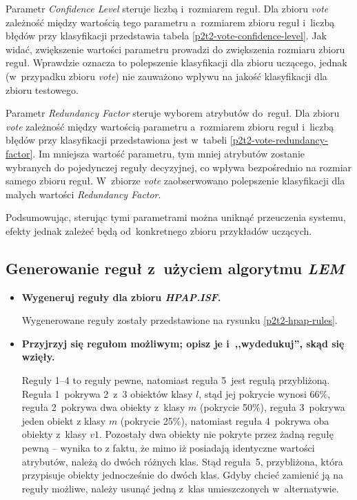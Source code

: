 \begin{itemize}
	
Parametr \emph{Confidence Level} steruje liczbą i~rozmiarem reguł. Dla zbioru \emph{vote} zależność między wartością tego parametru a~rozmiarem zbioru reguł i~liczbą błędów przy klasyfikacji przedstawia tabela \ref{p2t2-vote-confidence-level}. Jak widać, zwiększenie wartości parametru prowadzi do zwiększenia rozmiaru zbioru reguł. Wprawdzie oznacza to polepszenie klasyfikacji dla zbioru uczącego, jednak (w~przypadku zbioru \emph{vote}) nie zauważono wpływu na jakość klasyfikacji dla zbioru testowego.

	
Parametr \emph{Redundancy Factor} steruje wyborem atrybutów do~reguł. Dla zbioru \emph{vote} zależność między wartością parametru a~rozmiarem zbioru reguł i~liczbą błędów przy klasyfikacji przedstawiona jest w~tabeli \ref{p2t2-vote-redundancy-factor}. Im mniejsza wartość parametru, tym mniej atrybutów zostanie wybranych do pojedynczej reguły decyzyjnej, co wpływa bezpośrednio na rozmiar samego zbioru reguł. W~zbiorze \emph{vote} zaobserwowano polepszenie klasyfikacji dla małych wartości \emph{Redundancy Factor}.

Podsumowując, sterując tymi parametrami można uniknąć przeuczenia systemu, efekty jednak zależeć będą od~konkretnego zbioru przykładów uczących.
\end{itemize}


	\subsection{Generowanie reguł z~użyciem algorytmu \emph{LEM}}
	\label{sec:lem}

\begin{itemize}
\item \textbf{Wygeneruj reguły dla zbioru \emph{HPAP.ISF}.}

	
Wygenerowane reguły zostały przedstawione na rysunku \ref{p2t2-hpap-rules}.

\item \textbf{Przyjrzyj się regułom możliwym; opisz je i~,,wydedukuj'', skąd się wzięły.}

Reguły 1--4 to reguły pewne, natomiast reguła 5~jest regułą przybliżoną. Reguła 1~pokrywa 2~z~3 obiektów klasy $l$, stąd jej pokrycie wynosi 66\%, reguła 2~pokrywa dwa obiekty z~klasy $m$ (pokrycie 50\%), reguła 3~pokrywa jeden obiekt z klasy $m$ (pokrycie 25\%), natomiast reguła 4~pokrywa oba obiekty z~klasy $v1$. Pozostały dwa obiekty nie pokryte przez żadną regułę pewną -- wynika to z faktu, że mimo iż posiadają identyczne wartości atrybutów, należą do dwóch różnych klas. Stąd reguła~5, przybliżona, która przypisuje obiekty jednocześnie do dwóch klas. Gdyby chcieć zamienić ją na reguły możliwe, należy usunąć jedną z~klas umieszczonych w~alternatywie.

\end{itemize}

